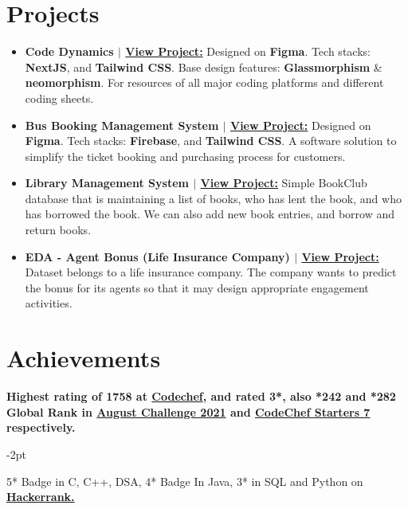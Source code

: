 \documentclass[letterpaper,11pt]{article}
\makeatletter
\newcommand{\resumeItem}[2]{
  \item\small{
    \textbf{#1}{ #2 \vspace{-2pt}}
  }
}
\newcommand{\resumeSubheading}[4]{
  \vspace{-1pt}\item
    \begin{tabular*}{0.97\textwidth}[t]{l@{\extracolsep{\fill}}r}
      \textbf{#1} & #2 \\
      \textit{\small#3} & \textit{\small #4} \\
    \end{tabular*}\vspace{-5pt}
}
\newcommand{\resumeSubItem}[2]{\resumeItem{#1}{#2}\vspace{-4pt}}
\newcommand{\resumeSubHeadingListStart}{\begin{itemize}[leftmargin=*]}
\newcommand{\resumeSubHeadingListEnd}{\end{itemize}}
\newcommand{\resumeItemListStart}{\begin{itemize}}
\newcommand{\resumeItemListEnd}{\end{itemize}\vspace{-5pt}}
\makeatother
\begin{document}
      
%

\section{Projects}
  \resumeSubHeadingListStart
    \resumeSubItem{\textbf{Code Dynamics} $|$ {\href{https://www.codedynamics.in/}{\bf View Project:}}}
      {Designed on \textbf{Figma}. Tech stacks: \textbf{NextJS}, and \textbf{Tailwind CSS}. Base design features: \textbf{Glassmorphism} & \textbf{neomorphism}. For resources of all major coding platforms and different coding sheets.}
    \resumeSubItem{\textbf{Bus Booking Management System} $|$ {\href{https://github.com/AnkitRajCode/Bus-Booking-Management-System}{\bf View Project:}}}
      {Designed on \textbf{Figma}. Tech stacks: \textbf{Firebase}, and \textbf{Tailwind CSS}. A software solution to simplify the ticket booking and purchasing process for customers.}
    \resumeSubItem{\textbf{Library Management System} $|$ {\href{https://satyajeetramnit.github.io/Library-Management-System/}{\bf View Project:}}}
      {Simple BookClub database that is maintaining a list of books, who has lent the book, and who has borrowed the book. We can also add new book entries, and borrow and return books.}
    \resumeSubItem{\textbf{EDA - Agent Bonus (Life Insurance Company)} $|$ {\href{https://github.com/satyajeetramnit/Data-Science-Projects/tree/main/Agent-Bonus-Life-Insurance_Company}{\bf View Project:}}}
      {Dataset belongs to a life insurance company. The company wants to predict the bonus for its agents so that it may design appropriate engagement activities.}
  \resumeSubHeadingListEnd


\section{Achievements}
 \resumeSubHeadingListStart
    	\resumeItem{Highest rating of \textbf{1758} at {\href{https://codechef.com/users/ramnit_code_27}{\bf Codechef}, and rated \textbf{3*}, also *242 and \textbf{*282} Global Rank in \href{https://www.codechef.com/AUG21C}{August Challenge 2021} and \href{https://www.codechef.com/START7C}{CodeChef Starters 7} respectively.}}
    	
    	\resumeItem{5* Badge in C, C++, DSA, 4* Badge In Java, 3* in SQL and Python on  {\href{https://www.hackerrank.com/satyajeetramnit1?hr_r=1}{\bf Hackerrank.}}}
 \resumeSubHeadingListEnd
 
\end{document}
